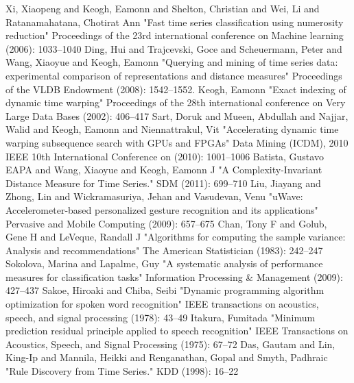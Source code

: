 \begin{thebibliography}{1} 
     Xi, Xiaopeng and Keogh, Eamonn and Shelton, Christian and Wei, Li and Ratanamahatana, Chotirat
    Ann "Fast time series classification using numerosity reduction" Proceedings of the 23rd international conference on
    Machine learning (2006): 1033--1040
     Ding, Hui and Trajcevski, Goce and Scheuermann, Peter and Wang, Xiaoyue and Keogh, Eamonn
    "Querying and mining of time series data: experimental comparison of representations and distance measures"
    Proceedings of the VLDB Endowment (2008): 1542--1552.
     Keogh, Eamonn "Exact indexing of dynamic time warping" Proceedings of the 28th
    international conference on Very Large Data Bases (2002): 406--417
     Sart, Doruk and Mueen, Abdullah and Najjar, Walid and Keogh, Eamonn and
    Niennattrakul, Vit "Accelerating dynamic time warping subsequence search with GPUs and FPGAs" Data Mining (ICDM),
    2010 IEEE 10th International Conference on (2010): 1001--1006
     Batista, Gustavo EAPA and Wang, Xiaoyue and Keogh, Eamonn J "A
    Complexity-Invariant Distance Measure for Time Series." SDM (2011): 699--710
     Liu, Jiayang and Zhong, Lin and Wickramasuriya, Jehan and Vasudevan, Venu "uWave:
    Accelerometer-based personalized gesture recognition and its applications" Pervasive and Mobile Computing
    (2009): 657--675
     Chan, Tony F and Golub, Gene H and LeVeque, Randall J "Algorithms for computing the
    sample variance: Analysis and recommendations" The American Statistician (1983): 242--247
     Sokolova, Marina and Lapalme, Guy "A systematic analysis of performance measures
    for classification tasks" Information Processing \& Management (2009): 427--437
     Sakoe, Hiroaki and Chiba, Seibi "Dynamic programming algorithm optimization for spoken
    word recognition" IEEE transactions on acoustics, speech, and signal processing (1978): 43--49
     Itakura, Fumitada "Minimum prediction residual principle applied to speech recognition"
    IEEE Transactions on Acoustics, Speech, and Signal Processing (1975): 67--72
     Das, Gautam and Lin, King-Ip and Mannila, Heikki and Renganathan, Gopal and Smyth, Padhraic
    "Rule Discovery from Time Series." KDD (1998): 16--22
\end{thebibliography}
